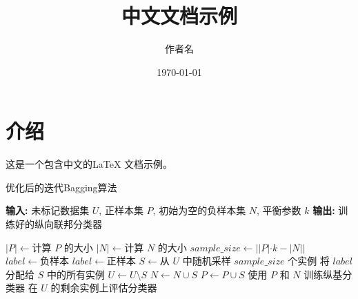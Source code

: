 \documentclass{article}
\begin{document}
	
	\title{中文文档示例}
	\author{作者名}
	\date{\today}
	
	\maketitle
	
	\section{介绍}
	这是一个包含中文的\LaTeX{} 文档示例。
	
	\begin{algorithm}
		\caption{优化后的迭代Bagging算法}
		\begin{algorithmic}[1]
			\State \textbf{输入:} 未标记数据集 $U$, 正样本集 $P$, 初始为空的负样本集 $N$, 平衡参数 $k$
			\State \textbf{输出:} 训练好的纵向联邦分类器
			
			\State $|P| \gets \text{计算 } P \text{ 的大小}$
			\State $|N| \gets \text{计算 } N \text{ 的大小}$
			\State $sample\_size \gets ||P| \cdot k - |N||$ 
			\State $label \gets \text{负样本}$
			\Else
			\State $label \gets \text{正样本}$
			\EndIf
			\State $S \gets \text{从 } U \text{ 中随机采样 } sample\_size \text{ 个实例}$
			\State 将 $label$ 分配给 $S$ 中的所有实例
			\State $U \gets U \setminus S$ 
			\State $N \gets N \cup S$ 
			\State $P \gets P \cup S$ 
			\State 使用 $P$ 和 $N$ 训练纵基分类器
			\State 在 $U$ 的剩余实例上评估分类器
			\EndProcedure
		\end{algorithmic}
	\end{algorithm}
	
\end{document}
